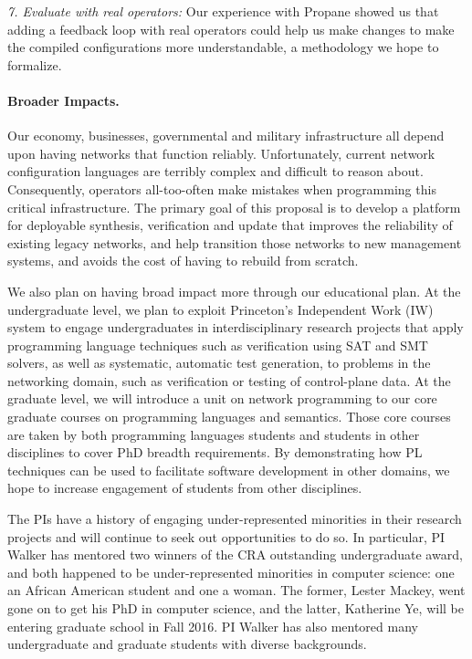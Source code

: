 {\em 7. Evaluate with real operators:} Our experience with Propane showed us that adding a feedback loop with real operators could help us make changes to make the compiled configurations more understandable, a methodology we hope to formalize.




\paragraph{Broader Impacts.}  
Our economy, businesses, governmental and military infrastructure all depend upon having networks that function
reliably.  Unfortunately, current network configuration languages are
terribly complex and difficult to reason about.  Consequently,
operators all-too-often make mistakes when programming this critical
infrastructure.  The primary goal of this proposal is to develop
a platform for deployable synthesis, verification and update that
improves the reliability of existing legacy networks, and help
transition those networks to new management systems, and avoids
the cost of having to rebuild from scratch.

We also plan on having broad impact more through our educational
plan. At the undergraduate level, we plan to exploit Princeton's
Independent Work (IW) system to engage undergraduates in interdisciplinary
research projects that apply programming language techniques such as
verification using SAT and SMT solvers, as well as systematic,
automatic test generation, to problems in the networking domain, such
as verification or testing of control-plane data.  At the graduate
level, we will introduce a unit on network programming to our core
graduate courses on programming languages and semantics.  Those core
courses are taken by both programming languages students and students
in other disciplines to cover PhD breadth requirements.  By
demonstrating how PL techniques can be used to facilitate software
development in other domains, we hope to increase engagement of
students from other disciplines.

The PIs have a history of engaging under-represented minorities in
their research projects and will continue to seek out opportunities to
do so.  In particular, PI Walker has mentored two winners of the CRA
outstanding undergraduate award, and both happened to be
under-represented minorities in computer science: one an African
American student and one a woman.  The former, Lester Mackey, went
gone on to get his PhD in computer science, and the latter, Katherine
Ye, will be entering graduate school in Fall 2016.  PI Walker has also mentored
many undergraduate and graduate students with diverse backgrounds.


